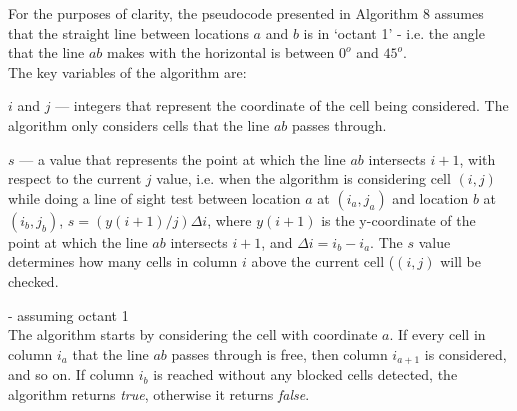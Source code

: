 \noindent
For the purposes of clarity, the pseudocode presented in Algorithm 8 assumes that the straight line between locations $a$ and $b$ is in `octant 1' - i.e. the angle that the line $ab$ makes with the horizontal is between $0^{o}$ and $45^{o}$.\\

\noindent
The key variables of the algorithm are:
\begin{description}
\item{$i$ and $j$} --- integers that represent the coordinate of the cell being considered. The algorithm only considers cells that the line $ab$ passes through.
\item{$s$} --- a value that represents the point at which the line $ab$ intersects $i+1$, with respect to the current $j$ value, i.e. when the algorithm is considering cell $(i,j)$ while doing a line of sight test between location $a$ at $(i_{a},j_{a})$ and location $b$ at $(i_{b},j_{b})$, $s = (y(i+1)/j)\Delta i$, where $y(i+1)$ is the y-coordinate of the point at which the line $ab$ intersects $i+1$, and $\Delta i = i_{b} - i_{a}$. The $s$ value determines how many cells in column $i$ above the current cell ($(i,j)$ will be checked.
\end{description}

 - assuming octant 1\\
\noindent
The algorithm starts by considering the cell with coordinate $a$. If every cell in column $i_{a}$ that the line $ab$ passes through is free, then column $i_{a+1}$ is considered, and so on. If column $i_{b}$ is reached without any blocked cells detected, the algorithm returns {\em true}, otherwise it returns {\em false}.\\

